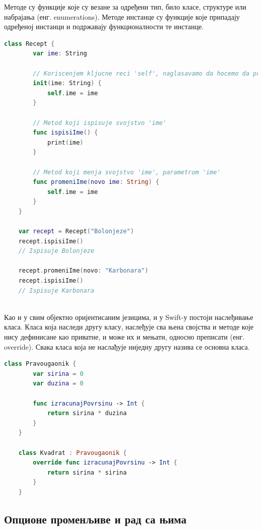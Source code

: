 \documentclass[12pt,oneside]{memoir}
\begin{document}

\indent Методе су функције које су везане за одређени тип, било класе, структуре или набрајања (енг. enumerations). Методе инстанце су функције које припадају одређеној инстанци и подржавају функционалности те инстанце.

\begin{lstlisting}[caption=\textit{{Методе}}, label={lst:Лења Методе}, language=Swift, frame=single]
    class Recept {
        var ime: String
        
        // Koriscenjem kljucne reci 'self', naglasavamo da hocemo da pristupimo svojstvu klase
        init(ime: String) {
            self.ime = ime
        }
        
        // Metod koji ispisuje svojstvo 'ime'
        func ispisiIme() {
            print(ime)
        }
        
        // Metod koji menja svojstvo 'ime', parametrom 'ime'
        func promeniIme(novo ime: String) {
            self.ime = ime
        }
    }
    
    var recept = Recept("Bolonjeze")
    recept.ispisiIme()
    // Ispisuje Bolonjeze
    
    recept.promeniIme(novo: "Karbonara")
    recept.ispisiIme()
    // Ispisuje Karbonara
    
\end{lstlisting}

\indent Као и у свим објектно оријентисаним језицима, и у Swift-у постоји наслеђивање класа. Класа која наследи другу класу, наслеђује сва њена својства и методе које нису дефинисане као приватне, и може их и мењати, односно преписати (енг. override). Свака класа која не наслађује ниједну другу назива се основна класа. 

\begin{lstlisting}[caption=\textit{{Наслеђивање класа}}, label={lst:Наслеђивање класа}, language=Swift, frame=single]
    class Pravougaonik {
        var sirina = 0
        var duzina = 0
        
        func izracunajPovrsinu -> Int {
            return sirina * duzina
        }
    }
    
    class Kvadrat : Pravougaonik {
        override func izracunajPovrsinu -> Int {
            return sirina * sirina
        }
    }
\end{lstlisting}

\subsection{Опционе променљиве и рад са њима}
\end{document}
